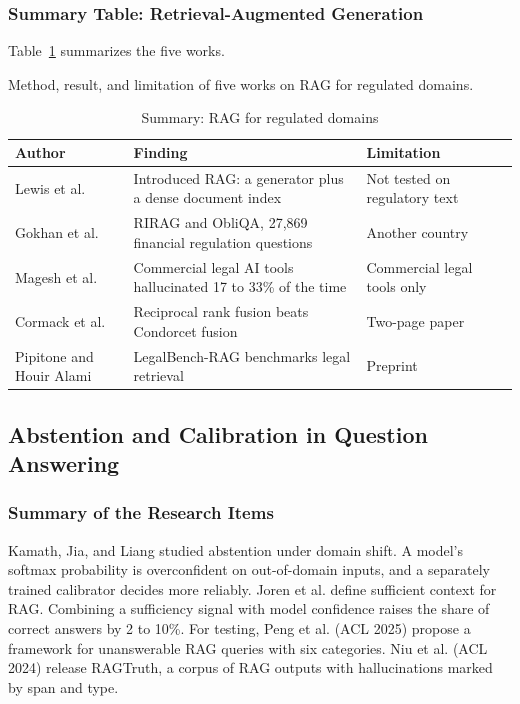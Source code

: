 \documentclass{FastFyp}
\makeatletter
\newcommand{\capdesc}[1]{%
  \par\nobreak
  \begingroup
  \setstretch{1}%
  \ifdefstring{\@captype}{figure}%
    {\vspace{0.2\baselineskip}}%
    {\vspace{-0.8\baselineskip}}%
  {\centering\normalfont\itshape\small
   \begin{minipage}{0.92\textwidth}\centering #1\end{minipage}\par}%
  \endgroup
  \vspace{0.4\baselineskip}%
}
\makeatother
\begin{document}
\subsubsection{Summary Table: Retrieval-Augmented Generation}
Table~\ref{tab:lr-rag} summarizes the five works.
\begin{table}[!ht]
\centering
\caption{Summary: RAG for regulated domains}
\capdesc{Method, result, and limitation of five works on RAG for regulated domains.}
\begin{tabular}{|p{3.0cm}|p{4.0cm}|p{2.8cm}|p{4.0cm}|}
\hline
\textbf{Author} & \textbf{Finding} & \textbf{Limitation} \\
\hline
Lewis et al. \cite{ref:lewis2020rag} & Introduced RAG: a generator plus a dense document index & Not tested on regulatory text \\
\hline
Gokhan et al. \cite{ref:gokhan2024rirag} & RIRAG and ObliQA, 27,869 financial regulation questions & Another country \\
\hline
Magesh et al. \cite{ref:magesh2025} & Commercial legal AI tools hallucinated 17 to 33\% of the time & Commercial legal tools only \\
\hline
Cormack et al. \cite{ref:cormack2009rrf} & Reciprocal rank fusion beats Condorcet fusion & Two-page paper \\
\hline
Pipitone and Houir Alami \cite{ref:pipitone2024legalbench} & LegalBench-RAG benchmarks legal retrieval & Preprint \\
\hline
\end{tabular}
\label{tab:lr-rag}
\end{table}

\subsection{Abstention and Calibration in Question Answering}

\subsubsection{Summary of the Research Items}
Kamath, Jia, and Liang \cite{ref:kamath2020selective} studied abstention under domain shift. A model's softmax probability is overconfident on out-of-domain inputs, and a separately trained calibrator decides more reliably. Joren et al. \cite{ref:joren2025sufficient} define sufficient context for RAG. Combining a sufficiency signal with model confidence raises the share of correct answers by 2 to 10\%. For testing, Peng et al. \cite{ref:peng2025unanswerability} (ACL 2025) propose a framework for unanswerable RAG queries with six categories. Niu et al. \cite{ref:niu2024ragtruth} (ACL 2024) release RAGTruth, a corpus of RAG outputs with hallucinations marked by span and type.
\end{document}
